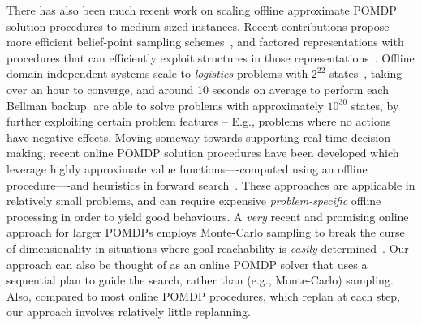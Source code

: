 There has also been much recent work on scaling offline approximate
POMDP solution procedures to medium-sized instances. Recent
contributions propose more efficient belief-point sampling
schemes~\cite{kurniawati:etal:2010,shani:etal:08}, and factored
representations with procedures that can efficiently exploit
structures in those
representations~\cite{brunskill:russell:2010,shani:etal:2008}. Offline
domain independent systems scale to {\em logistics} problems with
$2^{22}$ states~\cite{shani:etal:2008}, taking over an hour to
converge, and around 10 seconds on average to perform each Bellman
backup. \citeauthor{brunskill:russell:2010} are able to solve problems
with approximately $10^{30}$ states, by further exploiting certain
problem features -- E.g., problems where no actions have negative
effects.
Moving someway towards supporting real-time decision making, recent
online POMDP solution procedures have been developed which leverage
highly approximate value functions----computed using an offline
procedure----and heuristics in forward
search~\cite{ross:etal:2008}. These approaches are applicable in
relatively small problems, and can require
expensive \emph{problem-specific} offline processing in order to yield
good behaviours.
A {\em very} recent and promising online approach for
larger POMDPs employs Monte-Carlo sampling to break the curse of
dimensionality in situations where goal reachability is {\em easily}
determined~\cite{silver:veness:2010}. 
Our approach can also be thought of as an online POMDP solver that
uses a sequential plan to guide the search, rather than (e.g.,
Monte-Carlo) sampling. Also, compared to most online POMDP procedures, which
replan at each step, our approach involves relatively little replanning.







